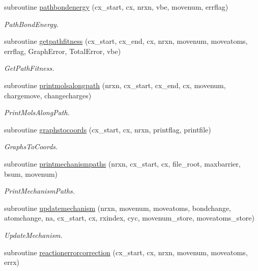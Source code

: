 \begin{DoxyCompactItemize}
subroutine \mbox{\hyperlink{namespacepathfinder_a2de94873987728e50c19bae54729c3cd}{pathbondenergy}} (cx\+\_\+start, cx, nrxn, vbe, movenum, errflag)
\begin{DoxyCompactList}\small\item\em Path\+Bond\+Energy. \end{DoxyCompactList}\item 
subroutine \mbox{\hyperlink{namespacepathfinder_acc50ac9bfc47024caf9ef5fb5dcba547}{getpathfitness}} (cx\+\_\+start, cx\+\_\+end, cx, nrxn, movenum, moveatoms, errflag, Graph\+Error, Total\+Error, vbe)
\begin{DoxyCompactList}\small\item\em Get\+Path\+Fitness. \end{DoxyCompactList}\item 
subroutine \mbox{\hyperlink{namespacepathfinder_ae5fe6225d1a966a604e1dc85be94b6e5}{printmolsalongpath}} (nrxn, cx\+\_\+start, cx\+\_\+end, cx, movenum, chargemove, changecharges)
\begin{DoxyCompactList}\small\item\em Print\+Mols\+Along\+Path. \end{DoxyCompactList}\item 
subroutine \mbox{\hyperlink{namespacepathfinder_a6bb04da4443080b8f2061719fee556f3}{graphstocoords}} (cx\+\_\+start, cx, nrxn, printflag, printfile)
\begin{DoxyCompactList}\small\item\em Graphs\+To\+Coords. \end{DoxyCompactList}\item 
subroutine \mbox{\hyperlink{namespacepathfinder_a93493afafe94aa6c6c7231b969a5711d}{printmechanismpaths}} (nrxn, cx\+\_\+start, cx, file\+\_\+root, maxbarrier, bsum, movenum)
\begin{DoxyCompactList}\small\item\em Print\+Mechanism\+Paths. \end{DoxyCompactList}\item 
subroutine \mbox{\hyperlink{namespacepathfinder_a38a57e9848ee768d8e19891d5fa91ff0}{updatemechanism}} (nrxn, movenum, moveatoms, bondchange, atomchange, na, cx\+\_\+start, cx, rxindex, cyc, movenum\+\_\+store, moveatoms\+\_\+store)
\begin{DoxyCompactList}\small\item\em Update\+Mechanism. \end{DoxyCompactList}\item 
subroutine \mbox{\hyperlink{namespacepathfinder_afbc92aeaed8e180333ae25bda3b93026}{reactionerrorcorrection}} (cx\+\_\+start, cx, nrxn, movenum, moveatoms, errx)

\end{DoxyCompactItemize}
